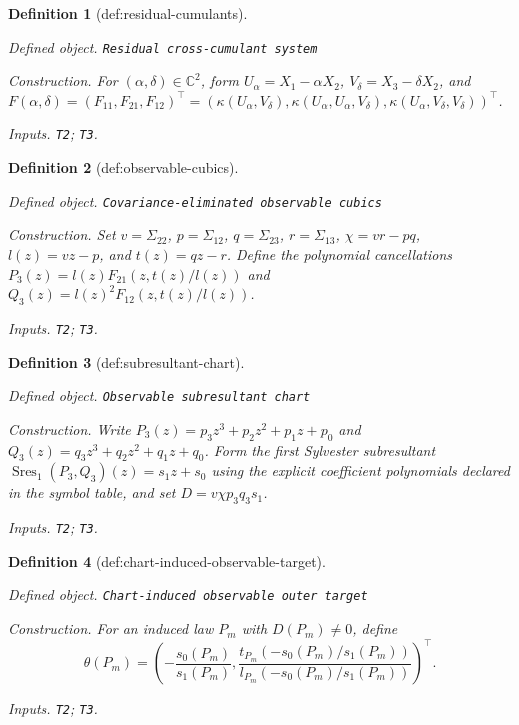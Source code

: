 \documentclass{article}
\newtheorem{definition}{Definition}
\begin{document}
\begin{definition}[def:residual-cumulants]\label{def:residual-cumulants}
\par\smallskip\noindent\emph{Defined object.} \texttt{Residual cross-\allowbreak{}cumulant system}
\par\smallskip\noindent\emph{Construction.} For \((\alpha,\delta)\in\mathbb C^2\), form \(U_\alpha=X_1-\alpha X_2\), \(V_\delta=X_3-\delta X_2\), and \(F(\alpha,\delta)=(F_{11},F_{21},F_{12})^\top=(\kappa(U_\alpha,V_\delta),\kappa(U_\alpha,U_\alpha,V_\delta),\kappa(U_\alpha,V_\delta,V_\delta))^\top\).
\par\smallskip\noindent\emph{Inputs.} \texttt{T2}; \texttt{T3}.
\end{definition}

\begin{definition}[def:observable-cubics]\label{def:observable-cubics}
\par\smallskip\noindent\emph{Defined object.} \texttt{Covariance-\allowbreak{}eliminated observable cubics}
\par\smallskip\noindent\emph{Construction.} Set \(v=\Sigma_{22}\), \(p=\Sigma_{12}\), \(q=\Sigma_{23}\), \(r=\Sigma_{13}\), \(\chi=vr-pq\), \(l(z)=vz-p\), and \(t(z)=qz-r\). Define the polynomial cancellations \(P_3(z)=l(z)F_{21}(z,t(z)/l(z))\) and \(Q_3(z)=l(z)^2F_{12}(z,t(z)/l(z))\).
\par\smallskip\noindent\emph{Inputs.} \texttt{T2}; \texttt{T3}.
\end{definition}

\begin{definition}[def:subresultant-chart]\label{def:subresultant-chart}
\par\smallskip\noindent\emph{Defined object.} \texttt{Observable subresultant chart}
\par\smallskip\noindent\emph{Construction.} Write \(P_3(z)=p_3z^3+p_2z^2+p_1z+p_0\) and \(Q_3(z)=q_3z^3+q_2z^2+q_1z+q_0\). Form the first Sylvester subresultant \(\operatorname{Sres}_1(P_3,Q_3)(z)=s_1z+s_0\) using the explicit coefficient polynomials declared in the symbol table, and set \(D=v\chi p_3q_3s_1\).
\par\smallskip\noindent\emph{Inputs.} \texttt{T2}; \texttt{T3}.
\end{definition}

\begin{definition}[def:chart-induced-observable-target]\label{def:chart-induced-observable-target}
\par\smallskip\noindent\emph{Defined object.} \texttt{Chart-\allowbreak{}induced observable outer target}
\par\smallskip\noindent\emph{Construction.} For an induced law \(P_m\) with \(D(P_m)\neq0\), define \[\theta(P_m)=\left(-\frac{s_0(P_m)}{s_1(P_m)},\frac{t_{P_m}(-s_0(P_m)/s_1(P_m))}{l_{P_m}(-s_0(P_m)/s_1(P_m))}\right)^\top.\]
\par\smallskip\noindent\emph{Inputs.} \texttt{T2}; \texttt{T3}.
\end{definition}
\end{document}
